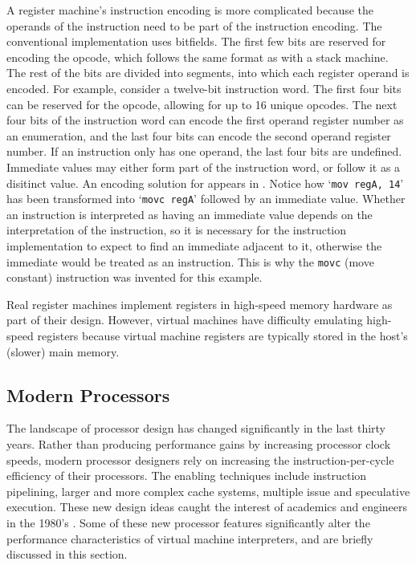 			A register machine's instruction encoding is more complicated because the operands of the instruction need to be part of the instruction encoding. The conventional implementation uses bitfields. The first few bits are reserved for encoding the opcode, which follows the same format as with a stack machine. The rest of the bits are divided into segments, into which each register operand is encoded. For example, consider a twelve-bit instruction word. The first four bits can be reserved for the opcode, allowing for up to 16 unique opcodes. The next four bits of the instruction word can encode the first operand register number as an enumeration, and the last four bits can encode the second operand register number. If an instruction only has one operand, the last four bits are undefined. Immediate values may either form part of the instruction word, or follow it as a disitinct value. An encoding solution for  appears in . Notice how `\texttt{mov regA, 14}' has been transformed into `\texttt{movc regA}' followed by an immediate value. Whether an instruction is interpreted as having an immediate value depends on the interpretation of the instruction, so it is necessary for the instruction implementation to expect to find an immediate adjacent to it, otherwise the immediate would be treated as an instruction. This is why the \texttt{movc} (move constant) instruction was invented for this example.
			
			Real register machines implement registers in high-speed memory hardware as part of their design. However, virtual machines have difficulty emulating high-speed registers because virtual machine registers are typically stored in the host's (slower) main memory.
			
			
		\subsection{Modern Processors}
			The landscape of processor design has changed significantly in the last thirty years. Rather than producing performance gains by increasing processor clock speeds, modern processor designers rely on increasing the instruction-per-cycle efficiency of their processors. The enabling techniques include instruction pipelining, larger and more complex cache systems, multiple issue and speculative execution. These new design ideas caught the interest of academics and engineers in the 1980's \citep{modernprocessordesign}. Some of these new processor features significantly alter the performance characteristics of virtual machine interpreters, and are briefly discussed in this section.
			
